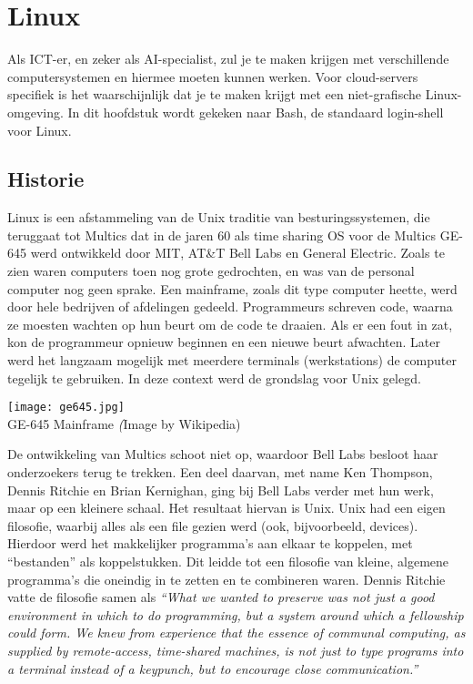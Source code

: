 \chapter{Linux}\label{ch:linux}

Als ICT-er, en zeker als AI-specialist, zul je te maken krijgen met verschillende computersystemen en hiermee moeten kunnen werken. Voor cloud-servers specifiek is het waarschijnlijk dat je te maken krijgt met een niet-grafische Linux-omgeving. In dit hoofdstuk wordt gekeken naar Bash, de standaard login-shell voor Linux.

\section{Historie}\label{historie}

Linux is een afstammeling van de Unix traditie van besturingssystemen, die teruggaat tot Multics dat in de jaren 60 als time sharing OS voor de Multics GE-645 werd ontwikkeld door MIT, AT\&T Bell Labs en General Electric. Zoals te zien waren computers toen nog grote gedrochten, en was van de personal computer nog geen sprake. Een mainframe, zoals dit type computer heette, werd door hele bedrijven of afdelingen gedeeld. Programmeurs schreven code, waarna ze moesten wachten op hun beurt om de code te draaien. Als er een fout in zat, kon de programmeur opnieuw beginnen en een nieuwe beurt afwachten. Later werd het langzaam mogelijk met meerdere terminals (werkstations) de computer tegelijk te gebruiken. In deze context werd de grondslag voor Unix gelegd.

  \begin{marginfigure}
\texttt{[image: ge645.jpg]}\\
    GE-645 Mainframe {\scriptsize\emph (Image by Wikipedia)}\\[3mm]
  \end{marginfigure}

De ontwikkeling van Multics schoot niet op, waardoor Bell Labs besloot haar onderzoekers terug te trekken. Een deel daarvan, met name Ken Thompson, Dennis Ritchie en Brian Kernighan, ging bij Bell Labs verder met hun werk, maar op een kleinere schaal. Het resultaat hiervan is Unix. Unix had een eigen filosofie, waarbij alles als een file gezien werd (ook, bijvoorbeeld, devices). Hierdoor werd het makkelijker programma's aan elkaar te koppelen, met ``bestanden'' als koppelstukken. Dit leidde tot een filosofie van kleine, algemene programma's die oneindig in te zetten en te combineren waren. Dennis Ritchie vatte de filosofie samen als \emph{``What we wanted to preserve was not just a good environment in which to do programming, but a system around which a fellowship could form. We knew from experience that the essence of communal computing, as supplied by remote-access, time-shared machines, is not just to type programs into a terminal instead of a keypunch, but to encourage close communication.''}

